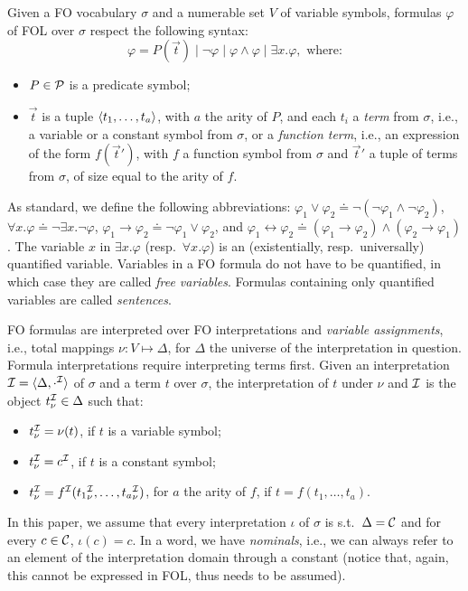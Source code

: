 Given a FO vocabulary $\sigma$ and a numerable set $V$ of
variable symbols, formulas $\varphi$ of FOL over $\sigma$
respect the following syntax:
$$\varphi = P(\vec t)\mid \lnot \varphi\mid \varphi\land\varphi\mid \exists
x.\varphi, \mbox{ where:}$$
\begin{itemize}
 \item $P\in \P$ is a predicate symbol;
 \item $\vec t$ is a tuple
	$\tup{t_1,\ldots,t_a}$, with $a$ the arity of $P$,
	and each $t_i$ a \emph{term} from $\sigma$, i.e., a variable or a constant
symbol from $\sigma$, or a \emph{function term}, i.e., an expression of the
form $f(\vec t')$, with $f$ a function symbol from $\sigma$ and $\vec t'$ a
tuple of terms
from $\sigma$, of size equal to the arity of $f$.
\end{itemize}
As standard, we define the following abbreviations:
$\varphi_1\lor \varphi_2\doteq \lnot(\lnot\varphi_1\land\lnot\varphi_2)$,
$\forall x.\varphi\doteq\lnot\exists x.\lnot\varphi$,
$\varphi_1 \rightarrow \varphi_2\doteq \lnot\varphi_1 \lor \varphi_2$,
and $\varphi_1 \leftrightarrow \varphi_2\doteq (\varphi_1 \rightarrow
\varphi_2) \land (\varphi_2 \rightarrow \varphi_1)$.
The variable $x$ in $\exists x.\varphi$ (resp.~$\forall x.\varphi$) is
an (existentially, resp.~universally) quantified variable.
Variables in a FO
formula do not have to be quantified, in which case they are called
\emph{free variables}.
Formulas containing only quantified variables are called \emph{sentences}.

FO formulas are interpreted over FO interpretations and
\emph{variable assignments}, i.e., total mappings $\nu:V\mapsto \Delta$,
for $\Delta$ the universe of the interpretation in question.
Formula interpretations require interpreting terms first.
Given an interpretation $\I=\tup{\Delta,\cdot^\I}$ of $\sigma$ and a term $t$
over $\sigma$, the
interpretation of $t$ under $\nu$ and $\I$ is the object
$t^\I_\nu\in \Delta$ such that:
\begin{itemize}
 \item $t^\I_\nu = \nu(t)$, if $t$ is a variable symbol;
 \item $t^\I_\nu = c^\I$, if $t$ is a constant symbol;
 \item $t^\I_\nu = f^\I({t_1}^\I_\nu,\ldots,{t_a}^\I_\nu)$, for $a$
the arity of $f$, if $t=f(t_1,\ldots,t_a)$.
\end{itemize}
In this paper, we assume that every interpretation $\iota$ of $\sigma$ is
s.t.~$\Delta=\C$ and
for every $c\in\C$, $\iota(c)=c$.
In a word, we have \emph{nominals}, i.e., we can always refer to an
element of the interpretation domain through a constant (notice that, again,
this cannot be expressed in FOL, thus needs to be assumed).


